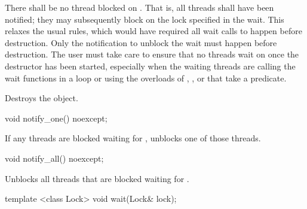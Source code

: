 \begin{itemdescr}
\pnum
\precondition There shall be no thread blocked on . \enternote That is, all
threads shall have been notified; they may subsequently block on the lock specified in the
wait.
This relaxes the usual rules, which would have required all wait calls to happen before
destruction. Only the notification to unblock the wait must happen before destruction.
The user must take care to ensure that no threads wait on  once the destructor has
been started, especially when the waiting threads are calling the wait functions in a loop or
using the overloads of , , or  that take a predicate.
\exitnote

\pnum\effects Destroys the object.
\end{itemdescr}

%
%
\begin{itemdecl}
void notify_one() noexcept;
\end{itemdecl}

\begin{itemdescr}
\pnum\effects If any threads are blocked waiting for , unblocks one of those threads.
\end{itemdescr}

%
%
\begin{itemdecl}
void notify_all() noexcept;
\end{itemdecl}

\begin{itemdescr}
\pnum\effects Unblocks all threads that are blocked waiting for .
\end{itemdescr}

%
%
\begin{itemdecl}
template <class Lock>
  void wait(Lock& lock);
\end{itemdecl}

